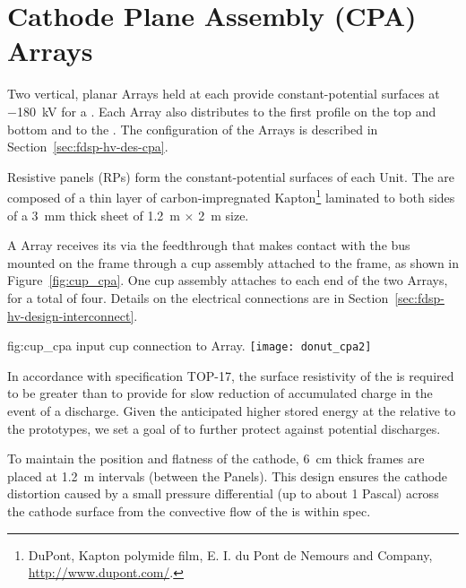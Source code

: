 \section{Cathode Plane Assembly (CPA) Arrays}

Two vertical, planar  Arrays held at  each provide constant-potential surfaces at \SI{-180}{\kV} for a . Each  Array also distributes  to the first profile on the top and bottom  and to the . The configuration of the  Arrays is described in Section~\ref{sec:fdsp-hv-des-cpa}.

Resistive panels (RPs) form the constant-potential surfaces of each  Unit. The  are  composed of a thin layer of carbon-impregnated Kapton\footnote{DuPont\texttrademark{}, Kapton\textsuperscript{\textregistered} polymide film,  E. I. du Pont de Nemours and Company,  \url{http://www.dupont.com/}.} laminated to both sides of a \SI{3}{\milli\meter} thick \frfour sheet of \SI{1.2}{\meter}  $\times$ \SI{2}{\meter} size.  

A  Array receives its  via the feedthrough that makes contact with the  bus mounted on the  frame through a cup assembly attached to the frame, as shown in Figure~\ref{fig:cup_cpa}. 
One cup assembly attaches to each end of the two  Arrays, for a total of four. Details on the electrical connections are in Section~\ref{sec:fdsp-hv-design-interconnect}.

\begin{dunefigure}{fig:cup_cpa}{ input cup connection to  Array.}
\texttt{[image: donut\_cpa2]} %
\end{dunefigure}

In accordance with specification TOP-17,
the surface resistivity of the  is required to be greater than \cathodemegohm to provide for slow reduction of accumulated charge in the event of a discharge.  Given the anticipated higher stored energy at the  
relative to the prototypes, we set a goal of \cathodegigohm to further  protect against potential discharges.  
 
To maintain the position and flatness of the cathode, 
\SI{6}{cm} thick \frfour frames are placed at \SI{1.2}{m} intervals (between the  Panels). This design ensures the cathode distortion caused by a small pressure differential (up to about 1 Pascal) across the cathode surface from the convective flow of the \lar is within spec. 

